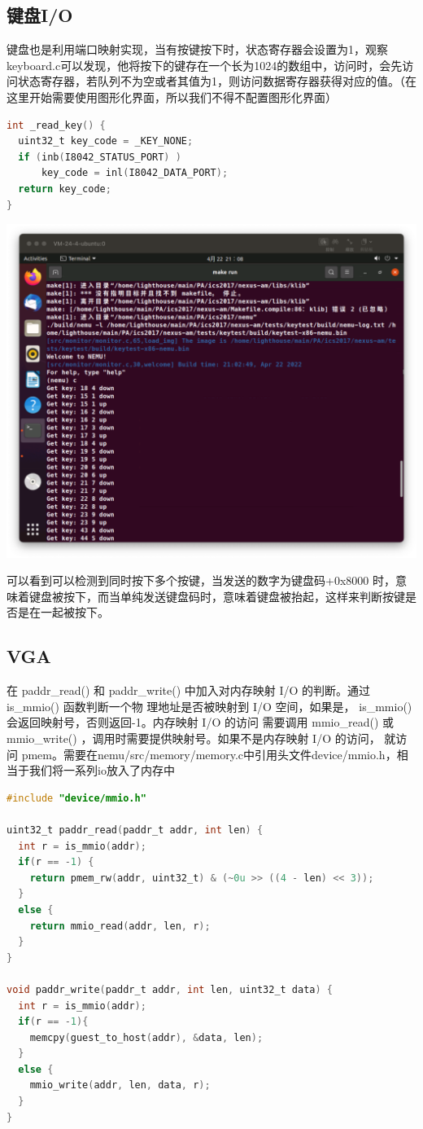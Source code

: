 \documentclass[UTF8,a4paper,10pt]{ctexart}
\begin{document}
\subsection{键盘I/O}
键盘也是利用端口映射实现，当有按键按下时，状态寄存器会设置为1，观察 keyboard.c可以发现，他将按下的键存在一个长为1024的数组中，访问时，会先访 问状态寄存器，若队列不为空或者其值为1，则访问数据寄存器获得对应的值。（在这里开始需要使用图形化界面，所以我们不得不配置图形化界面）
\begin{lstlisting}[language = C]
int _read_key() {
  uint32_t key_code = _KEY_NONE;
  if (inb(I8042_STATUS_PORT) )
      key_code = inl(I8042_DATA_PORT);
  return key_code;
}
\end{lstlisting}
\begin{center}
  \includegraphics*[scale = 0.35]{keu}
\end{center}

可以看到可以检测到同时按下多个按键，当发送的数字为键盘码+0x8000 时，意味着键盘被按下，而当单纯发送键盘码时，意味着键盘被抬起，这样来判断按键是否是在一起被按下。

\subsection{VGA}
在 paddr\_read() 和 paddr\_write() 中加入对内存映射 I/O 的判断。通过 is\_mmio() 函数判断一个物 理地址是否被映射到 I/O 空间，如果是， is\_mmio() 会返回映射号，否则返回-1。内存映射 I/O 的访问 需要调用 mmio\_read() 或 mmio\_write() ，调用时需要提供映射号。如果不是内存映射 I/O 的访问， 就访问 pmem。需要在nemu/src/memory/memory.c中引用头文件device/mmio.h，相当于我们将一系列io放入了内存中
\begin{lstlisting}[language = C]
#include "device/mmio.h"

uint32_t paddr_read(paddr_t addr, int len) {
  int r = is_mmio(addr);
  if(r == -1) {
    return pmem_rw(addr, uint32_t) & (~0u >> ((4 - len) << 3));
  }
  else {
    return mmio_read(addr, len, r);
  }
}

void paddr_write(paddr_t addr, int len, uint32_t data) {
  int r = is_mmio(addr);
  if(r == -1){
    memcpy(guest_to_host(addr), &data, len);
  }
  else {
    mmio_write(addr, len, data, r);
  }
}
\end{lstlisting}
\end{document}
